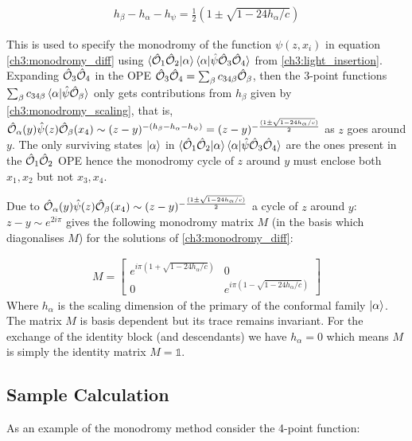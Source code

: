   \begin{align} \label{ch3:monodromy_scaling}
   h_\beta -h_\alpha -h_\psi = \frac{1}{2}\left(1\pm\sqrt{1-{24h_\alpha}/{c}}\right)
  \end{align}
  
  This is used to specify the monodromy of the function $\psi(z,x_i)$ in equation \ref{ch3:monodromy_diff} using $\braket{\hat{\mathcal{{O}}}_1\hat{\mathcal{{O}}}_2|\alpha}\braket{\alpha|\hat{\psi}\hat{\mathcal{{O}}}_3\hat{\mathcal{{O}}}_4}$ from  \ref{ch3:light_insertion}. Expanding $\hat{\mathcal{{O}}}_3\hat{\mathcal{{O}}}_4$ in the OPE $\hat{\mathcal{{O}}}_3\hat{\mathcal{{O}}}_4=\sum_{\beta}c_{34\beta}\hat{\mathcal{{O}}}_\beta$, then the 3-point functions $\sum_\beta c_{34\beta}\braket{\alpha|\hat{\psi}\hat{\mathcal{{O}}}_\beta}$ only gets contributions from $h_\beta$ given by \ref{ch3:monodromy_scaling}, that is, $\hat{\mathcal{{O}}}_\alpha(y)\hat{\psi}(z)\hat{\mathcal{{O}}}_\beta(x_4) \sim (z-y)^{-(h_\beta -h_\alpha -h_\psi )}=(z-y)^{-\frac{(1\pm\sqrt{1-{24h_\alpha}/{c}})}{2}}$ as $z$ goes around $y$. The only surviving states $\ket{\alpha}$ in $\braket{\hat{\mathcal{{O}}}_1\hat{\mathcal{{O}}}_2|\alpha}\braket{\alpha|\hat{\psi}\hat{\mathcal{{O}}}_3\hat{\mathcal{{O}}}_4}$ are the ones present in the $\hat{\mathcal{{O}}}_1\hat{\mathcal{{O}}}_2$ OPE hence the monodromy cycle of $z$ around $y$ must enclose both $x_1,x_2$ but not $x_3, x_4$. 
  
  Due to $\hat{\mathcal{{O}}}_\alpha(y)\hat{\psi}(z)\hat{\mathcal{{O}}}_\beta(x_4) \sim (z-y)^{-\frac{(1\pm\sqrt{1-{24h_\alpha}/{c}})}{2}}$ a cycle of $z$ around $y$: $z-y \sim e^{2i\pi}$ gives the following monodromy matrix $M$ (in the basis which diagonalises $M$) for the solutions of \ref{ch3:monodromy_diff}:
  
  \begin{align} \label{ch3:monodromy_matrix}
   M = \begin{bmatrix}
   e^{i\pi(1+\sqrt{1-{24h_\alpha}/{c}})} & 0 \\
   0 & e^{i\pi(1-\sqrt{1-{24h_\alpha}/{c}})}
   \end{bmatrix}
  \end{align}
  Where $h_\alpha$ is the scaling dimension of the primary of the conformal family $\ket{\alpha}$. The matrix $M$ is basis dependent but its trace remains invariant. For the exchange of the identity block (and descendants) we have $h_\alpha = 0$ which means $M$ is simply the identity matrix $M=\mathbb{1}$.
  
  \subsection{Sample Calculation}
  As an example of the monodromy method consider the 4-point function:
  
